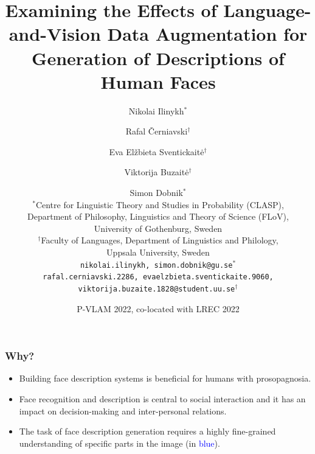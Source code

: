\documentclass[aspectratio=1610]{beamer} %
\title{Examining the Effects of Language-and-Vision Data Augmentation for Generation of Descriptions of Human Faces}
\author{
Nikolai Ilinykh$^{\ast}$ \and Rafal Černiavski$^{\dagger}$ \and Eva Elžbieta Sventickaitė$^{\dagger}$ \\ \and Viktorija Buzaitė$^{\dagger}$ \and Simon Dobnik$^{\ast}$ \\
	\vspace{.2cm}
        \small $^{\ast}$Centre for Linguistic Theory and Studies in Probability (CLASP), \\
        Department of Philosophy, Linguistics and Theory of Science (FLoV), \\
        University of Gothenburg, Sweden \\
	$^{\dagger}$Faculty of Languages, Department of Linguistics and Philology, \\ Uppsala University, Sweden \\
	\vspace{.2cm}
	\texttt{nikolai.ilinykh, simon.dobnik@gu.se}$^{\ast}$ \\
	\texttt{rafal.cerniavski.2286, evaelzbieta.sventickaite.9060, viktorija.buzaite.1828@student.uu.se}$^{\dagger}$ \\
      }
\date{P-VLAM 2022, co-located with LREC 2022}
\begin{document}
\frame[plain]{\titlepage}



\begin{frame}
\frametitle{Why?}

\begin{itemize}

\vspace{.7cm}
\item Building face description systems is beneficial for humans with prosopagnosia.
\pause
\item Face recognition and description is central to social interaction and it has an impact on decision-making and inter-personal relations.
\pause
\item The task of face description generation requires a highly fine-grained understanding of specific parts in the image (in \textcolor{blue}{blue}).

\end{itemize}


\end{frame}
\end{document}
